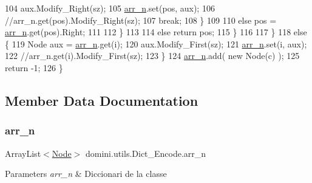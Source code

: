\begin{DoxyCode}
104                         aux.Modify\_Right(sz);
105                         \hyperlink{classdomini_1_1utils_1_1Dict__Encode_abc506ae01222e16d9b6581efbdad1a97}{arr\_n}.set(pos, aux);
106                         \textcolor{comment}{//arr\_n.get(pos).Modify\_Right(sz);}
107                         \textcolor{keywordflow}{break};
108                     \}
109 
110                     \textcolor{keywordflow}{else} pos = \hyperlink{classdomini_1_1utils_1_1Dict__Encode_abc506ae01222e16d9b6581efbdad1a97}{arr\_n}.get(pos).Right;
111 
112                 \}
113 
114                 \textcolor{keywordflow}{else} \textcolor{keywordflow}{return} pos;
115             \}
116 
117         \}
118         \textcolor{keywordflow}{else} \{
119             Node aux = \hyperlink{classdomini_1_1utils_1_1Dict__Encode_abc506ae01222e16d9b6581efbdad1a97}{arr\_n}.get(i);
120             aux.Modify\_First(sz);
121             \hyperlink{classdomini_1_1utils_1_1Dict__Encode_abc506ae01222e16d9b6581efbdad1a97}{arr\_n}.set(i, aux);
122             \textcolor{comment}{//arr\_n.get(i).Modify\_First(sz);}
123         \}
124         \hyperlink{classdomini_1_1utils_1_1Dict__Encode_abc506ae01222e16d9b6581efbdad1a97}{arr\_n}.add( \textcolor{keyword}{new} Node(c) );
125         \textcolor{keywordflow}{return} -1;
126     \}
\end{DoxyCode}


\subsection{Member Data Documentation}
\mbox{\label{classdomini_1_1utils_1_1Dict__Encode_abc506ae01222e16d9b6581efbdad1a97}} 
\subsubsection{\texorpdfstring{arr\+\_\+n}{arr\_n}}
{\footnotesize\ttfamily Array\+List$<$\hyperlink{classdomini_1_1utils_1_1Node}{Node}$>$ domini.\+utils.\+Dict\+\_\+\+Encode.\+arr\+\_\+n\hspace{0.3cm}{\ttfamily [private]}}


\begin{DoxyParams}{Parameters}
{\em arr\+\_\+n} & Diccionari de la classe \\
\hline
\end{DoxyParams}
\mbox{\label{classdomini_1_1utils_1_1Dict__Encode_a48fe9a878056a119ad36a0aad2727a13}} 
